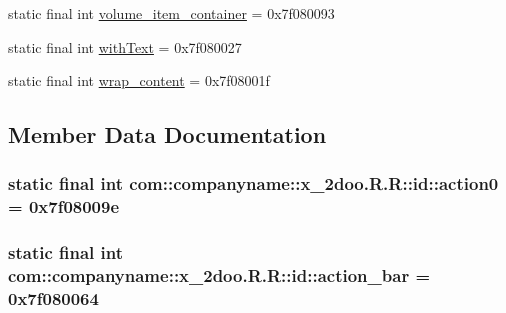 \begin{CompactItemize}
\item 
static final int \hyperlink{classcom_1_1companyname_1_1x__2doo_1_1_r_1_1id_93200752dc7132b43a211dffde5a52fe}{volume\_\-item\_\-container} = 0x7f080093
\item 
static final int \hyperlink{classcom_1_1companyname_1_1x__2doo_1_1_r_1_1id_211b058acebaf12aaf993395067d190e}{withText} = 0x7f080027
\item 
static final int \hyperlink{classcom_1_1companyname_1_1x__2doo_1_1_r_1_1id_64af69cbc210b18c0df870be84e1d559}{wrap\_\-content} = 0x7f08001f
\end{CompactItemize}


\subsection{Member Data Documentation}
\hypertarget{classcom_1_1companyname_1_1x__2doo_1_1_r_1_1id_97e848e58d1b699262f6a8d4e22a952d}{
\subsubsection[{action0}]{\setlength{\rightskip}{0pt plus 5cm}static final int com::companyname::x\_\-2doo.R.R::id::action0 = 0x7f08009e}}
\label{classcom_1_1companyname_1_1x__2doo_1_1_r_1_1id_97e848e58d1b699262f6a8d4e22a952d}


\hypertarget{classcom_1_1companyname_1_1x__2doo_1_1_r_1_1id_4d499f2ae1478dd0b26e7d7ebe739457}{
\subsubsection[{action\_\-bar}]{\setlength{\rightskip}{0pt plus 5cm}static final int com::companyname::x\_\-2doo.R.R::id::action\_\-bar = 0x7f080064}}
\label{classcom_1_1companyname_1_1x__2doo_1_1_r_1_1id_4d499f2ae1478dd0b26e7d7ebe739457}


